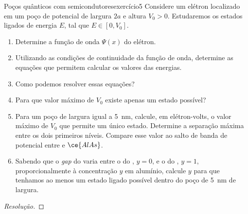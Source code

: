 \begin{exercício}{Poços quânticos com semicondutores}{exercício5}
    Considere um elétron localizado em um poço de potencial de largura \(2a\) e altura \(V_0 > 0\). Estudaremos os estados ligados de energia \(E\), tal que \(E \in [0, V_0].\)
    \begin{enumerate}[label=(\alph*)]
        \item Determine a função de onda \(\Psi(x)\) do elétron.
        \item Utilizando as condições de continuidade da função de onda, determine as equações que permitem calcular os valores das energias.
        \item Como podemos resolver essas equações?
        \item Para que valor máximo de \(V_0\) existe apenas um estado possível?
        \item Para um poço de largura igual a \SI{5}{\nano\meter}, calcule, em elétron-volts, o valor máximo de \(V_0\) que permite um único estado. Determine a separação máxima entre os dois primeiros níveis. Compare esse valor ao salto de banda de potencial entre  e \(\ce{AlAs}\).
        \item Sabendo que o \textit{gap} do  varia entre o do , \(y = 0\), e o do , \(y=1\), proporcionalmente à concentração \(y\) em alumínio, calcule \(y\) para que tenhamos ao menos um estado ligado possível dentro do poço de \SI{5}{\nano\meter} de largura.
    \end{enumerate}
\end{exercício}
\begin{proof}[Resolução]

\end{proof}
